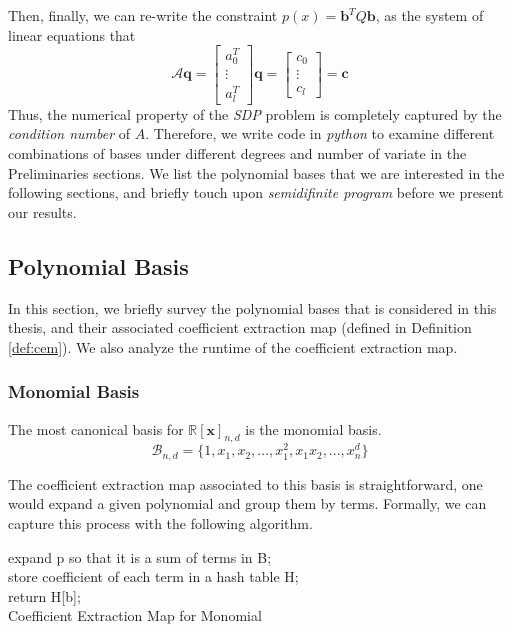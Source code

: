 \documentclass[12pt]{amsart}
\numberwithin{equation}{section}
\theoremstyle{definition}
\numberwithin{thm}{section}
\begin{document}
\smallskip
Then, finally, we can re-write the constraint $p(x) = \mathbf{b}^T Q \mathbf{b}$, as the system of linear equations that 
\begin{equation*}
     \mathcal{A} \mathbf{q} = \begin{bmatrix}
          a_0^T \\
          \vdots \\
          a_l^T
     \end{bmatrix} \mathbf{q} = \begin{bmatrix}
          c_0 \\
          \vdots \\
          c_l
     \end{bmatrix} = \mathbf{c}
\end{equation*}
Thus, the numerical property of the \emph{SDP} problem is completely captured by the \emph{condition number} of $A$. 
Therefore, we write code in \emph{python} to examine different combinations of bases under different degrees and number of variate in the Preliminaries sections. 
We list the polynomial bases that we are interested in the following sections, and briefly touch upon \emph{semidifinite program} before we present our results.

\newpage

\subsection{Polynomial Basis}
\label{Sec:polynomial Basis}
In this section, we briefly survey the polynomial bases that is considered in this thesis,
and their associated {coefficient extraction map} (defined in Definition \ref{def:cem}).
We also analyze the runtime of the {coefficient extraction map}.

\subsubsection{Monomial Basis}
The most canonical basis for $\mathbb{R}[\mathbf{x}]_{n, d}$ is the monomial basis. 
\begin{equation*}
     \mathcal{B}_{n, d} = \{1, x_1, x_2, ..., x_1^2, x_1 x_2, ..., x_n^d\}
\end{equation*}

The {coefficient extraction map} associated to this basis is straightforward, 
one would expand a given polynomial and group them by terms. Formally, we can capture this process with the following algorithm.

\begin{algorithm}[H]
     \SetAlgoLined
     expand p so that it is a sum of terms in B;\\
     store coefficient of each term in a hash table H;\\
     return H[b];\\
     \caption{Coefficient Extraction Map for Monomial}
\end{algorithm}
\end{document}
